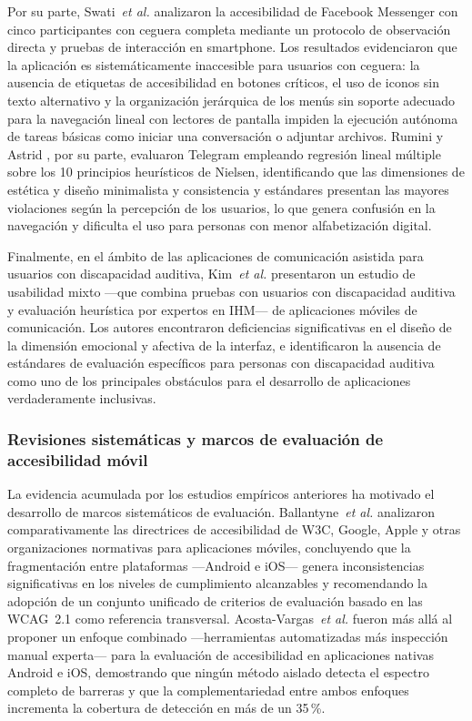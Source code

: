 \documentclass[journal]{IEEEtran}
\begin{document}
Por su parte, Swati~\textit{et al.} \cite{swati2021} analizaron la accesibilidad de Facebook Messenger con cinco participantes con ceguera completa mediante un protocolo de observaci\'on directa y pruebas de interacci\'on en smartphone. Los resultados evidenciaron que la aplicaci\'on es sistem\'aticamente inaccesible para usuarios con ceguera: la ausencia de etiquetas de accesibilidad en botones cr\'iticos, el uso de iconos sin texto alternativo y la organizaci\'on jer\'arquica de los men\'us sin soporte adecuado para la navegaci\'on lineal con lectores de pantalla impiden la ejecuci\'on aut\'onoma de tareas b\'asicas como iniciar una conversaci\'on o adjuntar archivos. Rumini y Astrid \cite{rumini2019}, por su parte, evaluaron Telegram empleando regresi\'on lineal m\'ultiple sobre los 10 principios heur\'isticos de Nielsen, identificando que las dimensiones de est\'etica y dise\~no minimalista y consistencia y est\'andares presentan las mayores violaciones seg\'un la percepci\'on de los usuarios, lo que genera confusi\'on en la navegaci\'on y dificulta el uso para personas con menor alfabetizaci\'on digital.

Finalmente, en el \'ambito de las aplicaciones de comunicaci\'on asistida para usuarios con discapacidad auditiva, Kim~\textit{et al.} \cite{kim2024} presentaron un estudio de usabilidad mixto ---que combina pruebas con usuarios con discapacidad auditiva y evaluaci\'on heur\'istica por expertos en IHM--- de aplicaciones m\'oviles de comunicaci\'on. Los autores encontraron deficiencias significativas en el dise\~no de la dimensi\'on emocional y afectiva de la interfaz, e identificaron la ausencia de est\'andares de evaluaci\'on espec\'ificos para personas con discapacidad auditiva como uno de los principales obst\'aculos para el desarrollo de aplicaciones verdaderamente inclusivas.

\subsubsection{Revisiones sistem\'aticas y marcos de evaluaci\'on de accesibilidad m\'ovil}

La evidencia acumulada por los estudios emp\'iricos anteriores ha motivado el desarrollo de marcos sistem\'aticos de evaluaci\'on. Ballantyne~\textit{et al.} \cite{ballantyne2018} analizaron comparativamente las directrices de accesibilidad de W3C, Google, Apple y otras organizaciones normativas para aplicaciones m\'oviles, concluyendo que la fragmentaci\'on entre plataformas ---Android e iOS--- genera inconsistencias significativas en los niveles de cumplimiento alcanzables y recomendando la adopci\'on de un conjunto unificado de criterios de evaluaci\'on basado en las WCAG~2.1 como referencia transversal. Acosta-Vargas~\textit{et al.} \cite{acosta2021} fueron m\'as all\'a al proponer un enfoque combinado ---herramientas automatizadas m\'as inspecci\'on manual experta--- para la evaluaci\'on de accesibilidad en aplicaciones nativas Android e iOS, demostrando que ning\'un m\'etodo aislado detecta el espectro completo de barreras y que la complementariedad entre ambos enfoques incrementa la cobertura de detecci\'on en m\'as de un 35\,\%.
\end{document}
